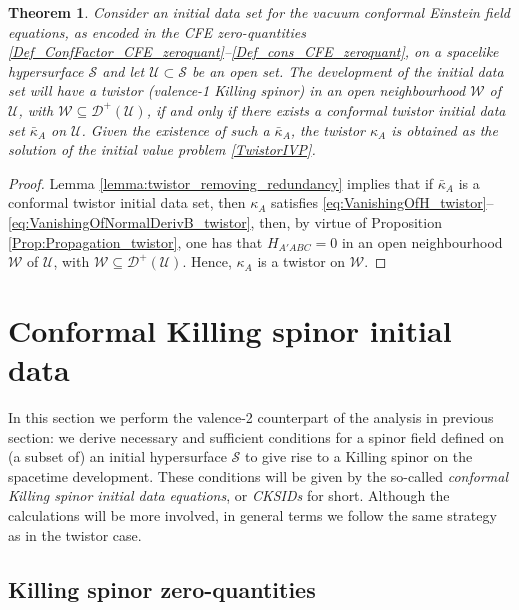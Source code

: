 \documentclass[10pt,a4paper]{article}
\theoremstyle{plain}
\newtheorem{theorem}{Theorem}
\begin{document}
\begin{theorem}\label{Theorem_twistor}
Consider an initial data set for the vacuum conformal Einstein field
equations, as encoded in the CFE zero-quantities
\eqref{Def_ConfFactor_CFE_zeroquant}--\eqref{Def_cons_CFE_zeroquant},
on a spacelike hypersurface $\mathcal{S}$ and let
$\mathcal{U}\subset\mathcal{S}$ be an open set.  The development of
the initial data set will have a twistor (valence-1 Killing spinor) in
an open neighbourhood $\mathcal{W}$ of $\mathcal{U}$, with
$\mathcal{W}\subseteq \mathcal{D}^{+}(\mathcal{U})$, if and only if
there exists a conformal twistor initial data set $\bar{\kappa}_A$ on
$\mathcal{U}$.  Given the existence of such a $\bar{\kappa}_A$, the
twistor $\kappa_A$ is obtained as the solution of the initial value
problem \eqref{TwistorIVP}.
\end{theorem}
\begin{proof}
  Lemma \ref{lemma:twistor_removing_redundancy} implies that if
  $\bar{\kappa}_A$ is a conformal twistor initial data set, then
  $\kappa_A$ satisfies
  \eqref{eq:VanishingOfH_twistor}--\eqref{eq:VanishingOfNormalDerivB_twistor},
  then, by virtue of Proposition \ref{Prop:Propagation_twistor}, one
  has that $H_{A'ABC}=0$ in an open neighbourhood $\mathcal{W}$ of
  $\mathcal{U}$, with $\mathcal{W}\subseteq
  \mathcal{D}^{+}(\mathcal{U})$. Hence, $\kappa_A$ is a
  twistor on $\mathcal{W}$.
\end{proof}

  
\section{Conformal Killing spinor initial data}
  \label{conformalKSKID}

In this section we perform the valence-2 counterpart of the analysis in previous section: we derive necessary and sufficient conditions for a spinor field defined on (a subset of) an initial hypersurface $\mathcal{S}$ to give rise to a Killing spinor on the spacetime development. These conditions will be given by the so-called \emph{conformal Killing spinor initial data
equations}, or \emph{CKSIDs} for short. Although the calculations will be more
involved, in general terms we follow the same strategy as in the twistor case.

\subsection{Killing spinor zero-quantities}
\end{document}
